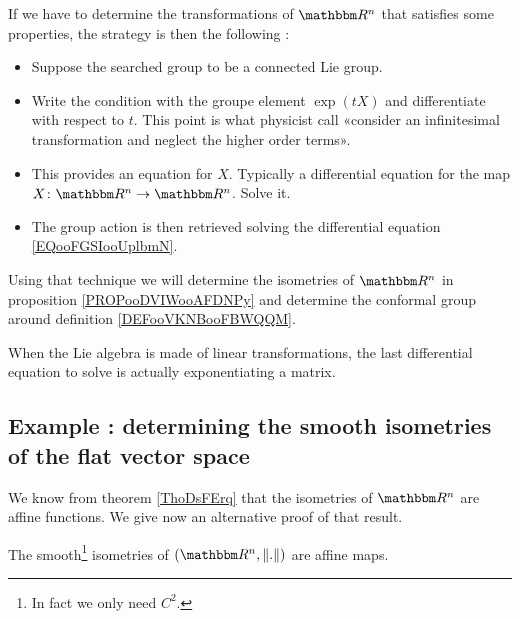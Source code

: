 \begin{normaltext}      \label{NORMooMGAUooIoLtjW}
    If we have to determine the transformations of \( \eR^n\) that satisfies some properties, the strategy is then the following :
    \begin{itemize}
        \item Suppose the searched group to be a connected Lie group.
        \item Write the condition with the groupe element \( \exp(tX)\) and differentiate with respect to \( t\). This point is what physicist call «consider an infinitesimal transformation and neglect the higher order terms».
        \item This provides an equation for \( X\). Typically a differential equation for the map \( X\colon \eR^n\to \eR^n\). Solve it.
        \item The group action is then retrieved solving the differential equation \eqref{EQooFGSIooUplbmN}.
    \end{itemize}
    Using that technique we will determine the isometries of \( \eR^n\) in proposition \ref{PROPooDVIWooAFDNPy} and determine the conformal group around definition \ref{DEFooVKNBooFBWQQM}.  %
\end{normaltext}

\begin{remark}
    When the Lie algebra is made of linear transformations, the last differential equation to solve is actually exponentiating a matrix.
\end{remark}

\subsection{Example : determining the smooth isometries of the flat vector space}

We know from theorem \ref{ThoDsFErq} that the isometries of \( \eR^n\) are affine functions. We give now an alternative proof of that result.

\begin{proposition}     \label{PROPooDVIWooAFDNPy}
    The smooth\footnote{In fact we only need \( C^2\).} isometries of \( (\eR^n,\| . \|)  \)  are affine maps.
\end{proposition}

